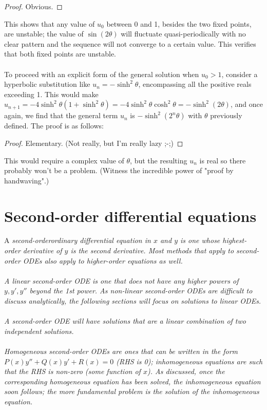 \documentclass{article}
\begin{document}
\begin{proof}
    Obvious.
\end{proof}
This shows that any value of $u_0$ between 0 and 1, besides the two fixed points, are unstable; the value of $\sin(2\theta)$ will fluctuate quasi-periodically with no clear pattern and the sequence will not converge to a certain value. This verifies that both fixed points are unstable.
\\ \\
To proceed with an explicit form of the general solution when $u_0 > 1$, consider a hyperbolic substitution like $u_n = -\sinh^2 \theta$, encompassing all the positive reals exceeding 1. This would make $u_{n+1} = -4\sinh^2 \theta(1+\sinh^2 \theta) = -4\sinh^2 \theta \cosh^2 \theta = -\sinh^2 (2\theta)$, and once again, we find that the general term $u_n$ is $-\sinh^2(2^n \theta)$ with $\theta$ previously defined. The proof is as follows:
\begin{proof}
    Elementary. (Not really, but I'm really lazy ;-;)
\end{proof}
This would require a complex value of $\theta$, but the resulting $u_n$ is real so there probably won't be a problem. (Witness the incredible power of "proof by handwaving".)

\section{Second-order differential equations}
\begin{definition}
A \it{second-order}\normalfont  ordinary differential equation in $x$ and $y$ is one whose highest-order derivative of $y$ is the second derivative. Most methods that apply to second-order ODEs also apply to higher-order equations as well. \\ \\
A \it{linear} \normalfont  second-order ODE is one that does not have any higher powers of $y, y', y''$ beyond the 1st power. As non-linear second-order ODEs are difficult to discuss analytically, the following sections will focus on solutions to linear ODEs.
\\ \\
A second-order ODE will have solutions that are a linear combination of two independent solutions. \\ \\
\it Homogeneous \normalfont second-order ODEs are ones that can be written in the form $P(x)y'' + Q(x)y' + R(x) = 0$ (RHS is 0); inhomogeneous equations are such that the RHS is non-zero (some function of $x$). As discussed, once the corresponding homogeneous equation has been solved, the inhomogeneous equation soon follows; the more fundamental problem is the solution of the inhomogeneous equation.
\end{definition}
\end{document}
